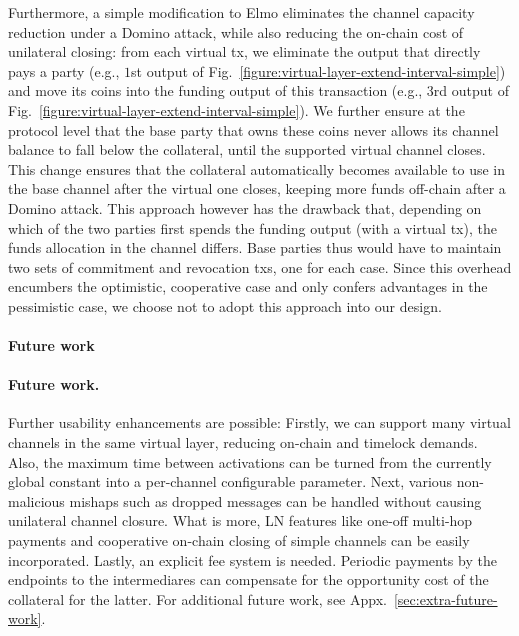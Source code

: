 Furthermore, a simple modification to Elmo eliminates the channel capacity
reduction under a Domino attack, while also reducing the on-chain
cost of unilateral closing: from each virtual tx, we
eliminate the output that directly
pays a party (e.g., $1$st output of
Fig.~\ref{figure:virtual-layer-extend-interval-simple}) and move its coins into
the funding output of this transaction (e.g., $3$rd
output of Fig.~\ref{figure:virtual-layer-extend-interval-simple}). We further
ensure at the protocol level that the base party that owns these coins never
allows its channel balance to fall below the collateral, until the supported
virtual channel closes. This change ensures that the collateral
automatically becomes available to use in the base channel after the virtual one
closes, keeping more funds off-chain after a Domino attack. This approach
however has the drawback that, depending on which of the two parties first
spends the funding output (with a virtual tx), the funds allocation in the
channel differs. Base parties thus would have to maintain two sets of commitment
and revocation txs, one for each case. Since this overhead encumbers the
optimistic, cooperative case and only confers advantages in the pessimistic
case, we choose not to adopt this approach into our design.

\makeatletter%
%
  {\paragraph{Future work}}%
  {\paragraph{Future work.}}%
\makeatother%
Further usability enhancements are possible: Firstly, we can support many
virtual channels in the same virtual layer, reducing on-chain and timelock
demands. Also, the maximum time between activations can be turned from the
currently global constant into a per-channel configurable parameter. Next,
various non-malicious mishaps such as dropped messages can be handled without
causing unilateral channel closure. What is more, LN features like one-off
multi-hop payments and cooperative on-chain closing of simple channels can be
easily incorporated. Lastly, an explicit fee system is needed. Periodic payments
by the endpoints to the intermediares can compensate for the opportunity cost of
the collateral for the latter. For additional future work, see
Appx.~\ref{sec:extra-future-work}.
